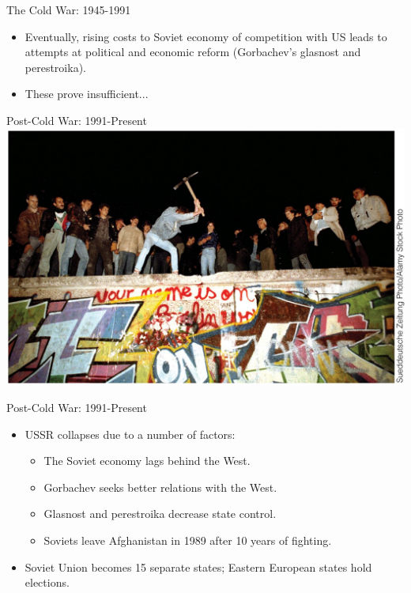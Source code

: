 \documentclass{beamer}
\begin{document}
\begin{frame}{\LARGE The Cold War: 1945-1991}
	\begin{itemize}
		\item Eventually, rising costs to Soviet economy of competition with US leads to attempts at political and economic reform (Gorbachev's glasnost and perestroika).
		\item These prove insufficient...		
	\end{itemize}
\end{frame}

\begin{frame}{\LARGE Post-Cold War: 1991-Present}
\centering
\includegraphics[width=\textwidth,height=.9\textheight,keepaspectratio]{Berlinwall.jpg}
\end{frame}

\begin{frame}{\LARGE Post-Cold War: 1991-Present}
	\begin{itemize}
		\item USSR collapses due to a number of factors:
		\begin{itemize}
			\item The Soviet economy lags behind the West.
			\item Gorbachev seeks better relations with the West.
			\item Glasnost and perestroika decrease state control.
			\item Soviets leave Afghanistan in 1989 after 10 years of fighting.
		\end{itemize}
		\item Soviet Union becomes 15 separate states; Eastern European states hold elections.
	\end{itemize}
\end{frame}
\end{document}
